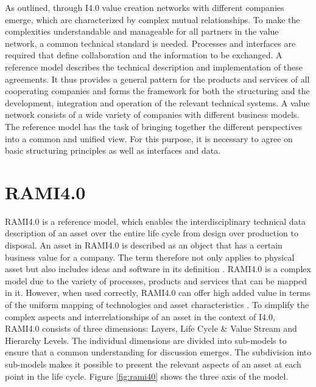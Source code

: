 As outlined, through \ac{I4.0} value creation networks with different companies emerge, which are characterized by complex mutual relationships. To make the complexities understandable and manageable for all partners in the value network, a common technical standard is needed. Processes and interfaces are required that define collaboration and the information to be exchanged. A reference model describes the technical description and implementation of these agreements. It thus provides a general pattern for the products and services of all cooperating companies and forms the framework for both the structuring and the development, integration and operation of the relevant technical systems. A value network consists of a wide variety of companies with different business models. The reference model has the task of bringing together the different perspectives into a common and unified view. For this purpose, it is necessary to agree on basic structuring principles as well as interfaces and data.    


\section{RAMI4.0}
\ac{RAMI4.0} is a reference model, which enables the interdisciplinary technical data description of an asset over the entire life cycle from design over production to disposal. An asset in \ac{RAMI4.0} is described as an object that has a certain business value for a company. The term therefore not only applies to physical asset but also includes ideas and software in its definition \cite[p. 31]{Heidel2017ReferenzarchitekturmodellIndustrie4.0Komponente}. \ac{RAMI4.0} is a complex model due to the variety of processes, products and services that can be mapped in it. However, when used correctly, \ac{RAMI4.0} can offer high added value in terms of the uniform mapping of technologies and asset characteristics \cite[p. 23]{Arnold2018DigitaleMittelstand}. To simplify the complex aspects and interrelationships of an asset in the context of \ac{I4.0}, \ac{RAMI4.0} consists of three dimensions: Layers, Life Cycle \& Value Stream and Hierarchy Levels. The individual dimensions are divided into sub-models to ensure that a common understanding for discussion emerges. The subdivision into sub-models makes it possible to present the relevant aspects of an asset at each point in the life cycle. Figure \ref{fig:rami40} shows the three axis of the model. 

